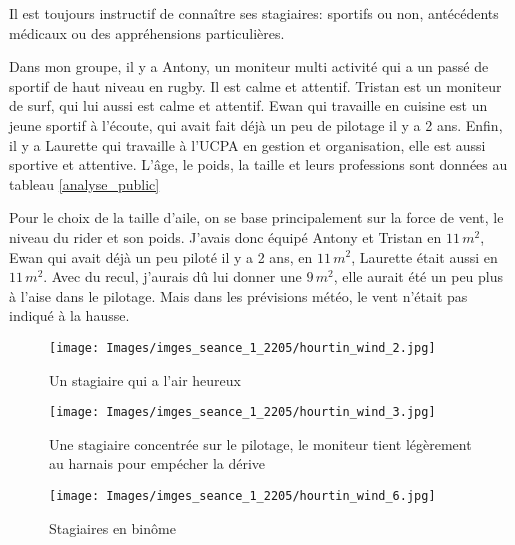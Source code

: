 \documentclass[11pt,a4paper]{report}
\begin{document}
Il est toujours instructif de connaître ses stagiaires: 
sportifs ou non, antécédents médicaux ou des appréhensions particulières.

Dans mon groupe, il y a Antony, un moniteur multi activité qui a un passé 
de sportif de haut niveau en rugby. Il est calme et attentif.
Tristan est un moniteur de surf, qui lui aussi est calme et attentif.
Ewan qui travaille en cuisine est un jeune sportif à l'écoute, qui avait 
fait déjà un peu de pilotage il y a 2 ans.
Enfin, il y a Laurette qui travaille à l'UCPA en gestion et 
organisation, elle est aussi  sportive et attentive. L'\^age, le poids, la taille
et leurs professions sont données au tableau \ref{analyse_public}

Pour le choix de la taille d'aile, on se base principalement sur la force
de vent, le niveau du rider et son poids. J'avais donc équipé Antony et Tristan
en $11\, m^2$, Ewan qui avait déjà un peu piloté il y a 2 ans, en $11\, m^2$,
 Laurette était aussi en $11\, m^2$.
Avec du recul, j'aurais d\^u lui donner une  $9\, m^2$, elle aurait été un peu plus
à l'aise dans le pilotage. Mais dans les prévisions météo, le vent n'était pas
indiqué à la hausse.

\begin{figure}
\begin{minipage}{0.4\textwidth}
\texttt{[image: Images/imges\_seance\_1\_2205/hourtin\_wind\_2.jpg]} 
\caption{Un stagiaire qui a l'air heureux}
\end{minipage}
\hfill
\begin{minipage}{0.4\textwidth}
\texttt{[image: Images/imges\_seance\_1\_2205/hourtin\_wind\_3.jpg]} 
\caption{Une stagiaire concentrée sur le pilotage, le moniteur tient légèrement
au harnais pour emp\'echer la dérive}
\end{minipage}
\end{figure}

\begin{figure}
\centering
\texttt{[image: Images/imges\_seance\_1\_2205/hourtin\_wind\_6.jpg]}
\caption{Stagiaires en bin\^ome} 
\end{figure}
\end{document}
